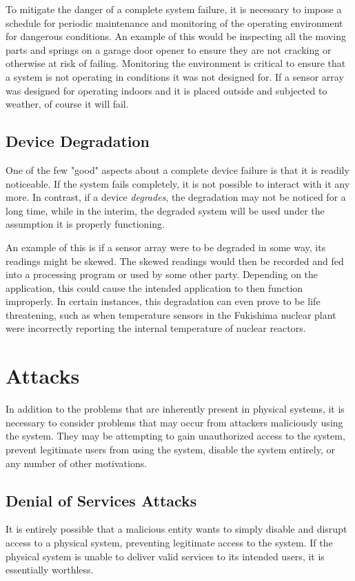 To mitigate the danger of a complete system failure, it is necessary to impose a schedule for periodic maintenance and
monitoring of the operating environment for dangerous conditions. An example of this would be inspecting all the moving
parts and springs on a garage door opener to ensure they are not cracking or otherwise at risk of failing. 
Monitoring the environment is critical to ensure that a system is not operating in conditions it was not designed for. If a sensor
array was designed for operating indoors and it is placed outside and subjected to weather, of course it will fail.


\subsection{Device Degradation}
One of the few "good" aspects about a complete device failure is that it is readily noticeable. If the system fails completely,
it is not possible to interact with it any more. In contrast, if a device \textit{degrades}, the degradation may not be noticed
for a long time, while in the interim, the degraded system will be used under the assumption it is properly functioning.

An example of this is if a sensor array were to be degraded in some way, its readings might be skewed. The skewed readings
would then be recorded and fed into a processing program or used by some other party. Depending on the application, this
could cause the intended application to then function improperly. In certain instances, this degradation can even prove to be
life threatening, such as when temperature sensors in the Fukishima nuclear plant were incorrectly reporting the internal
temperature of nuclear reactors.~\cite{fukushima}

\section{Attacks}
In addition to the problems that are inherently present in physical systems, it is necessary to consider problems that may
occur from attackers maliciously using the system. They may be attempting to gain unauthorized access to the system,
prevent legitimate users from using the system, disable the system entirely, or any number of other motivations.

\subsection{Denial of Services Attacks}
It is entirely possible that a malicious entity wants to simply disable and disrupt access to a physical system, preventing legitimate access
to the system. If the physical system is unable to deliver valid services to its intended users, it is essentially worthless. 

